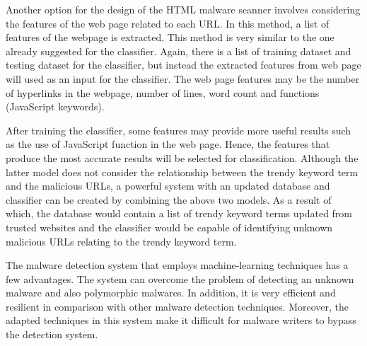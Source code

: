 Another option for the design of the HTML malware scanner involves considering the features of the web page related to each URL. In this method, a list of features of the webpage is extracted. This method is very similar to the one already suggested for the classifier. Again, there is a list of training dataset and testing dataset for the classifier, but instead the extracted features from web page will used as an input for the classifier. The web page features may be the number of hyperlinks in the webpage, number of lines, word count and functions (JavaScript keywords).

After training the classifier, some features may provide more useful results such as the use of JavaScript function in the web page. Hence, the features that produce the most accurate results will be selected for classification. Although the latter model does not consider the relationship between the trendy keyword term and the malicious URLs, a powerful system with an updated database and classifier can be created by combining the above two models. As a result of which, the database would contain a list of trendy keyword terms updated from trusted websites and the classifier would be capable of identifying unknown malicious URLs relating to the trendy keyword term.

The malware detection system that employs machine-learning techniques has a few advantages. The system can overcome the problem of detecting an unknown malware and also polymorphic malwares. In addition, it is very efficient and resilient in comparison with other malware detection techniques. Moreover, the adapted techniques in this system make it difficult for malware writers to bypass the detection system. 





